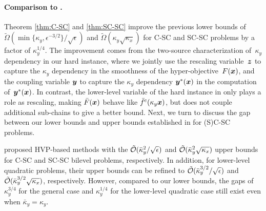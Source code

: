 \documentclass{article}
\begin{document}
{ 
\paragraph{Comparison to \citep{ji2023lower}.} 
Theorem \ref{thm:C-SC} and \ref{thm:SC-SC} improve the previous lower bounds of $\tilde \Omega(\min \{ \kappa_y, \epsilon^{-3/2} \} / \sqrt{\epsilon}  )$ and 
$\tilde \Omega (\kappa_y \sqrt{\kappa_x})$
for C-SC and SC-SC  problems \citep{ji2023lower} by a factor of $\kappa_y^{1/4}$. The improvement comes from the two-source characterization of~$\kappa_y$ dependency in our hard instance, where we jointly use the rescaling variable~${\bm{z}}$ to capture the $\kappa_y$ dependency in the smoothness of the hyper-objective~$F({\bm{x}})$, and the coupling variable ${\bm{y}}$ to capture the $\kappa_y$ dependency ${\bm{y}}^*({\bm{x}})$ in the computation of~${\bm{y}}^*({\bm{x}})$. In contrast, the lower-level variable of the hard instance in \citep{ji2023lower} only plays a role as rescaling, making
$\bar F({\bm{x}})$ behave like $\bar f^{\rm c}(\kappa_y {\bm{x}})$, but does not couple additional sub-chains to give a better bound.
Next, we turn to discuss the gap between our lower bounds and upper bounds established in \citep{ji2023lower} for (S)C-SC problems.}



\begin{remark}
\citet{ji2023lower} proposed HVP-based methods with the $\tilde {{\mathcal{O}}}(\bar \kappa_y^2 / \sqrt{\epsilon})$ and $\tilde {{\mathcal{O}}}(\bar \kappa_y^2 \sqrt{\kappa_x})$ upper bounds for C-SC and SC-SC bilevel problems, respectively. In addition, for lower-level quadratic problems, their upper bounds can be refined to 
$\tilde {{\mathcal{O}}}(\bar \kappa_y^{3/2} / \sqrt{\epsilon})$ and $\tilde {{\mathcal{O}}}(\bar \kappa_y^{3/2} \sqrt{\kappa_x})$, respectively.
However, compared to our lower bounds, the gaps of $\kappa_y^{3/4}$ for the general case and $\kappa_y^{1/4}$ for the lower-level quadratic case still exist even when $\bar \kappa_y =  \kappa_y$.
\end{remark}
\end{document}
